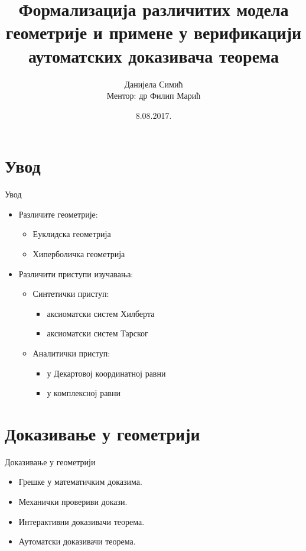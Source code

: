 \documentclass[slidestop, compress, mathserif, containsverbatim, xcolor=dvipsnames]{beamer}
\title{Формализација различитих модела геометрије и примене у
  верификацији аутоматских доказивача теорема}
\author[Данијела Симић]{Данијела Симић\\{\small Ментор: др Филип Марић}}
\institute{Математички факултет \\ Универзитет у Београду}
\date{8.08.2017.}
\begin{document}
\begin{frame}
\titlepage
\end{frame}

\section{Увод}

\begin{frame}{Увод}
  \begin{itemize}
  \item Различите геометрије:
     \begin{itemize}
     \item Еуклидска геометрија
     \item Хиперболичка геометрија
     \end{itemize} \vfill
   \item Различити приступи изучавања:
     \begin{itemize}
     \item Синтетички приступ:
       \begin{itemize}
       \item аксиоматски систем Хилберта
       \item аксиоматски систем Тарског
       \end{itemize}
     \item Аналитички приступ:
       \begin{itemize}
       \item у Декартовој координатној равни
       \item у комплексној равни
       \end{itemize}
     \end{itemize}\vfill
  \end{itemize}
\end{frame}

\section{Доказивање у геометрији}
\begin{frame}{Доказивање у геометрији}
  \begin{itemize}
  \item Грешке у математичким доказима. \vfill
  \item Механички провериви докази. \vfill
  \item Интерактивни доказивачи теорема. \vfill
  \item Аутоматски доказивачи теорема. \vfill
  \end{itemize}
\end{frame}
\end{document}
